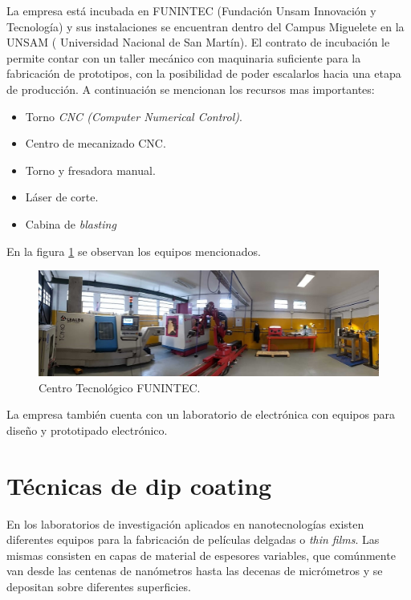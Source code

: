La empresa está incubada en FUNINTEC (Fundación Unsam Innovación y Tecnología) y sus instalaciones se encuentran dentro del Campus Miguelete en la UNSAM ( Universidad Nacional de San Martín). El contrato de incubación le permite contar con un taller mecánico con maquinaria suficiente para la fabricación de  prototipos, con la posibilidad de poder escalarlos hacia una etapa de producción. A continuación se mencionan los recursos mas importantes:
 
\begin{itemize}
\item Torno \textit{CNC (Computer Numerical Control)}.
\item Centro de mecanizado CNC.
\item Torno y fresadora manual.
\item Láser de corte.
\item Cabina de \textit{blasting}
\end{itemize}

En la figura \ref{fig:taller} se observan los equipos mencionados.

\begin{figure}[htpb]
\centering 
\includegraphics[width=1\textwidth]{./Figures/taller.jpg}
\caption{Centro Tecnológico FUNINTEC.}
\label{fig:taller}
\end{figure}

La empresa también cuenta con un laboratorio de electrónica con equipos para diseño y prototipado electrónico.

\section{Técnicas de dip coating}

En los laboratorios de investigación aplicados en nanotecnologías existen diferentes equipos para la fabricación de películas delgadas o \textit{thin films}. Las mismas consisten en capas de material de espesores variables, que comúnmente van desde las centenas de nanómetros hasta las decenas de micrómetros y se depositan sobre diferentes superficies.



